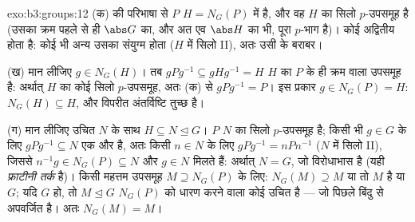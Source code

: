 \begin{solution}{exo:b3:groups:12}
(क)  की परिभाषा से $P$ $H = N_G(P)$ में  है, और वह
$H$ का सिलो $p$-उपसमूह है (उसका क्रम पहले से ही $\abs G$ का, और
अत एव $\abs H$ का भी, पूरा $p$-भाग है)। कोई  
अद्वितीय होता है: कोई भी अन्य उसका संयुग्म होता ($H$ में सिलो II),
अतः उसी के बराबर।

(ख) मान लीजिए $g \in N_G(H)$। तब $gPg^{-1} \subseteq gHg^{-1} = H$ $H$ का $P$ के ही क्रम वाला उपसमूह
है: अर्थात् $H$ का कोई सिलो $p$-उपसमूह, अतः (क) से $gPg^{-1} = P$। इस
प्रकार $g \in
N_G(P) = H$: $N_G(H) \subseteq H$, और विपरीत अंतर्विष्टि तुच्छ है।

(ग) मान लीजिए उचित $N$ के साथ $H \subseteq N \trianglelefteq G$। $P$ $N$ का सिलो
$p$-उपसमूह है; किसी भी $g \in G$ के लिए $gPg^{-1} \subseteq N$ एक और है, अतः किसी
$n \in N$ के लिए $gPg^{-1} = nPn^{-1}$ ($N$ में सिलो II), जिससे $n^{-1}g \in N_G(P)
\subseteq N$ और $g \in N$ मिलते
हैं: अर्थात् $N = G$, जो विरोधाभास है (यही \emph{फ्राटीनी तर्क} है)।
किसी महत्तम उपसमूह $M \supseteq
N_G(P)$ के लिए: $N_G(M) \supseteq M$ या तो $M$ है या $G$;
यदि $G$ हो, तो $M \trianglelefteq G$ $N_G(P)$ को धारण करने वाला कोई उचित  है --- जो पिछले बिंदु से अपवर्जित है। अतः $N_G(M) = M$।
\end{solution}

